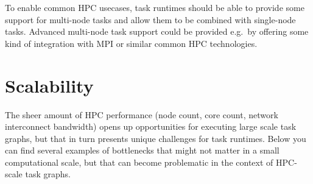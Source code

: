 To enable common HPC usecases, task runtimes should be able to provide some support for multi-node
tasks and allow them to be combined with single-node tasks. Advanced multi-node task support could
be provided e.g.\ by offering some kind of integration with MPI or similar common HPC technologies.


\section{Scalability}
The sheer amount of HPC performance (node count, core count, network interconnect bandwidth) opens
up opportunities for executing large scale task graphs, but that in turn presents unique challenges
for task runtimes. Below you can find several examples of bottlenecks that might not matter in a
small computational scale, but that can become problematic in the context of HPC-scale task graphs.

